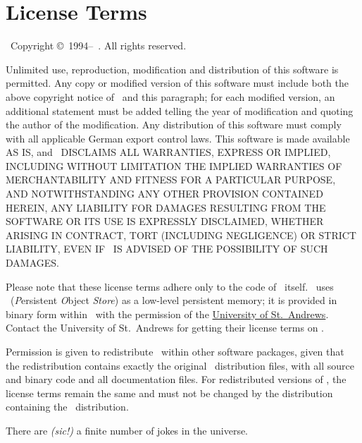 {\section{License Terms}}%
\label{sec:LicenseTerms}

\edef\THISAUTHOR{\expandafter\uppercase{\thisauthor}}

\plob\ Copyright \copyright\ 1994--\thisyear\ \thisauthor. All
rights reserved.

Unlimited use, reproduction, modification and distribution of this
software is permitted.  Any copy or modified version of this software
must include both the above copyright notice of \thisauthor\ and this
paragraph; for each modified version, an additional statement must be
added telling the year of modification and quoting the author of the
modification.  Any distribution of this software must comply with all
applicable German export control laws.  This software is made
available AS IS, and \THISAUTHOR\ DISCLAIMS ALL
WARRANTIES, EXPRESS OR IMPLIED, INCLUDING WITHOUT LIMITATION THE
IMPLIED WARRANTIES OF MERCHANTABILITY AND FITNESS FOR A PARTICULAR
PURPOSE, AND NOTWITHSTANDING ANY OTHER PROVISION CONTAINED HEREIN, ANY
LIABILITY FOR DAMAGES RESULTING FROM THE SOFTWARE OR ITS USE IS
EXPRESSLY DISCLAIMED, WHETHER ARISING IN CONTRACT, TORT (INCLUDING
NEGLIGENCE) OR STRICT LIABILITY, EVEN IF \THISAUTHOR\ IS
ADVISED OF THE POSSIBILITY OF SUCH DAMAGES.

Please note that these license terms adhere only to the code of \plob\ 
itself. \plob\ uses \postore\ (\textit{P}ersistent \textit{O}bject
\textit{Store}) as a low-level persistent memory; it is provided in
binary form within \plob\ with the permission of the
\href{http://www-ppg.dcs.st-andrews.ac.uk}{University of St.\ 
  Andrews}. Contact the University of St.\ Andrews for getting their
license terms on \postore.

Permission is given to redistribute \plob\ within other software
packages, given that the redistribution contains exactly the original
\plob\ distribution files, with all source and binary code and all
documentation files. For redistributed versions of \plob, the license
terms remain the same and must not be changed by the distribution
containing the \plob\ distribution.

\vspace*{\fill}
\begin{fortune}
  \hspace*{\fill}There are \emph{(sic!)} a finite number of jokes in
  the universe.
\from{David Byrne: Stop Making Sense}
\end{fortune}

